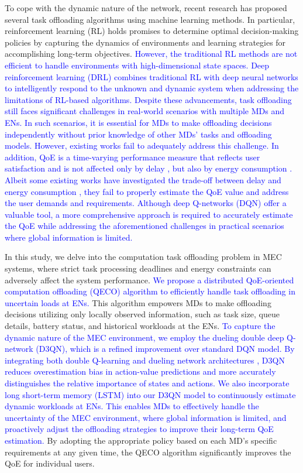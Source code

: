 \documentclass[10pt, journal,letterpaper]{IEEEtran}
\begin{document}
To cope with the dynamic nature of the network, recent research has proposed several task offloading algorithms using machine learning methods. In particular, reinforcement learning (RL) \cite{mnih2015human} holds promises to determine optimal decision-making policies by capturing the dynamics of environments and learning strategies for accomplishing long-term objectives. \textcolor{blue}{However, the traditional RL methods are not efficient to  handle  environments with high-dimensional state  spaces. Deep reinforcement learning (DRL) combines  traditional RL  with  deep  neural  networks  to  intelligently respond to the unknown and dynamic system when addressing the limitations of RL-based algorithms. Despite these advancements, task offloading still faces significant challenges in real-world scenarios with multiple MDs and ENs. In such scenarios, it is essential for MDs to make offloading decisions independently  without prior knowledge of other MDs’ tasks and offloading models. However,  existing works fail to adequately address this challenge. In addition, QoE is a time-varying performance measure that reflects user satisfaction and is not affected only by delay \cite{guo2022energy}, but also by energy consumption \cite{tang2022uav}. Albeit some existing works have investigated the trade-off between delay and energy consumption \cite{li2022joint}, they fail to properly estimate the QoE value and address the user demands and requirements. Although deep Q-networks (DQN) offer a valuable tool, a more comprehensive approach is required to accurately estimate the QoE while addressing the aforementioned challenges in practical scenarios where global information is limited.}



    	
In this study, we delve into the computation task offloading problem in MEC systems, where strict task processing deadlines and energy constraints can adversely affect the system performance.   \textcolor{blue}{We propose a distributed QoE-oriented computation offloading (QECO) algorithm to efficiently handle task offloading in uncertain loads at ENs.} This algorithm empowers MDs to make offloading decisions utilizing only locally observed information, such as task size, queue details, battery status, and historical workloads at the ENs. 
  \textcolor{blue}{To capture the dynamic nature of the MEC environment, we employ the dueling double deep Q-network (D3QN), which is a refined improvement over standard DQN model. By integrating both double Q-learning \cite{van2016deep} and dueling network architectures \cite{wang2016dueling}, D3QN reduces overestimation bias in action-value predictions and more accurately distinguishes the relative importance of states and actions. We also incorporate long short-term memory (LSTM) \cite{hochreiter1997long} into our D3QN model to continuously estimate dynamic workloads at ENs. This enables MDs to effectively handle the uncertainty of the MEC environment, where global information is limited, and proactively adjust the offloading strategies to improve their long-term QoE estimation.} By adopting the appropriate policy based on each MD’s specific requirements at any given time, the QECO algorithm significantly improves the QoE for individual users. 
\end{document}
